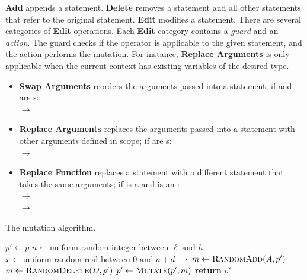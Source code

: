 \textbf{Add} appends a statement. \textbf{Delete} removes a statement and all other statements that refer to the original statement. \textbf{Edit} modifies a statement. There are several categories of \textbf{Edit} operations. Each \textbf{Edit} category contains a \emph{guard} and an \emph{action}. The guard checks if the operator is applicable to the given \Substance statement, and the action performs the mutation. For instance, \textbf{Replace Arguments} is only applicable when the current context has existing variables of the desired type. 
\begin{itemize}[leftmargin=*]
    \item \textbf{Swap Arguments} reorders the arguments passed into a statement; \eg if  and  are s:\\
             $\rightarrow$ 
    \item \textbf{Replace Arguments} replaces the arguments passed into a statement with other arguments defined in scope; \eg if  are s:\\
             	$\rightarrow$ 
    \item \textbf{Replace Function} replaces a statement with a different statement that takes the same arguments; \eg if  is a  and  is an :\\
             $\rightarrow$  \\
             $\rightarrow$ 
\end{itemize}

\begin{algorithm}
\caption{The \Edgeworth mutation algorithm. }\label{alg:mutation}
\begin{algorithmic}[1]
\State $p' \gets p$
\State $n \gets \text{uniform random integer between $\ell$ and $h$}$\label{line:mutations}
    \State $x \gets \text{uniform random real between $0$ and $a + d + e$}$\label{line:kind}
        \State $m \gets \textsc{RandomAdd}(A, p')$\label{line:add}
        \State $m \gets \textsc{RandomDelete}(D, p')$\label{line:delete}
    \Else
        \label{line:statements}
        \label{line:edit}
    \EndIf
    \State $p' \gets \textsc{Mutate}(p', m)$
\EndFor
\State \textbf{return} $p'$
\EndFunction
\end{algorithmic}
\end{algorithm}


